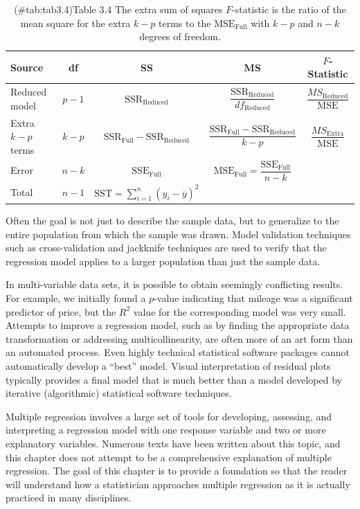 \documentclass[
]{report}
\begin{document}
\begin{table}[!h]
\centering
\caption{(\#tab:tab3.4)Table 3.4 The extra sum of squares $F$-statistic is the ratio of the mean square for the extra $k-p$ terms to the $\text{MSE}_{\text{Full}}$ with $k-p$ and $n-k$ degrees of freedom.}
\centering
\begin{tabular}[t]{lcccc}
\toprule
Source & df & SS & MS & $F$-Statistic\\
\midrule
Reduced model & $p - 1$ & $\text{SSR}_{\text{Reduced}}$ & $\dfrac{\text{SSR}_{\text{Reduced}}}{df_{\text{Reduced}}}$ & $\dfrac{MS_{\text{Reduced}}}{\text{MSE}}$\\
Extra $k - p$ terms & $k - p$ & $\text{SSR}_{\text{Full}} - \text{SSR}_{\text{Reduced}}$ & $\dfrac{\text{SSR}_{\text{Full}} - \text{SSR}_{\text{Reduced}}}{k-p}$ & $\dfrac{MS_{\text{Extra}}}{\text{MSE}}$\\
Error & $n - k$ & $\text{SSE}_{\text{Full}}$ & $\text{MSE}_{\text{Full}} = \dfrac{\text{SSE}_{\text{Full}}}{n - k}$ & \\
Total & $n - 1$ & $\text{SST} = \sum_{i=1}^n (y_i - \overline{y})^2$ &  & \\
\bottomrule
\end{tabular}
\end{table}

Often the goal is not just to describe the sample data, but to generalize to the entire population from which the sample was drawn. Model validation techniques such as cross-validation and jackknife techniques are used to verify that the regression model applies to a larger population than just the sample data.

In multi-variable data sets, it is possible to obtain seemingly conflicting results. For example, we initially
found a \(p\)-value indicating that mileage was a significant predictor of price, but the \(R^2\) value for the corresponding model was very small. Attempts to improve a regression model, such as by finding the appropriate data transformation or addressing multicollinearity, are often more of an art form than an automated process. Even highly technical statistical software packages cannot automatically develop a ``best'' model. Visual interpretation of residual plots typically provides a final model that is much better than a model developed by iterative (algorithmic) statistical software techniques.

Multiple regression involves a large set of tools for developing, assessing, and interpreting a regression model with one response variable and two or more explanatory variables. Numerous texts have been written about this topic, and this chapter does not attempt to be a comprehensive explanation of multiple regression. The goal of this chapter is to provide a foundation so that the reader will understand how a statistician approaches multiple regression as it is actually practiced in many disciplines.
\end{document}
